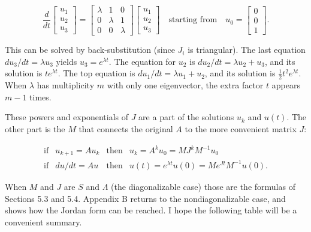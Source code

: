 \[\frac{d}{dt}\begin{bmatrix}u_{1}\\ u_{2}\\ u_{3}\end{bmatrix}=\begin{bmatrix}\lambda&1&0\\ 0&\lambda&1\\ 0&0&\lambda\end{bmatrix}\begin{bmatrix}u_{1}\\ u_{2}\\ u_{3}\end{bmatrix}\quad\text{starting from}\quad u_{0}=\begin{bmatrix}0\\ 0\\ 1\end{bmatrix}.\]

This can be solved by back-substitution (since \(J_{i}\) is triangular). The last equation \(du_{3}/dt=\lambda u_{3}\) yields \(u_{3}=e^{\lambda t}\). The equation for \(u_{2}\) is \(du_{2}/dt=\lambda u_{2}+u_{3}\), and its solution is \(te^{\lambda t}\). The top equation is \(du_{1}/dt=\lambda u_{1}+u_{2}\), and its solution is \(\frac{1}{2}t^{2}e^{\lambda t}\). When \(\lambda\) has multiplicity \(m\) with only one eigenvector, the extra factor \(t\) appears \(m-1\) times.

These powers and exponentials of \(J\) are a part of the solutions \(u_{k}\) and \(u(t)\). The other part is the \(M\) that connects the original \(A\) to the more convenient matrix \(J\):

\[\begin{array}{llll}\text{if}&u_{k+1}=Au_{k}&\text{then}&u_{k}=A^{k}u_{0}=MJ^ {k}M^{-1}u_{0}\\ \text{if}&du/dt=Au&\text{then}&u(t)=e^{\lambda t}u(0)=Me^{Jt}M^{-1}u(0).\end{array}\]

When \(M\) and \(J\) are \(S\) and \(\Lambda\) (the diagonalizable case) those are the formulas of Sections 5.3 and 5.4. Appendix B returns to the nondiagonalizable case, and shows how the Jordan form can be reached. I hope the following table will be a convenient summary.

 